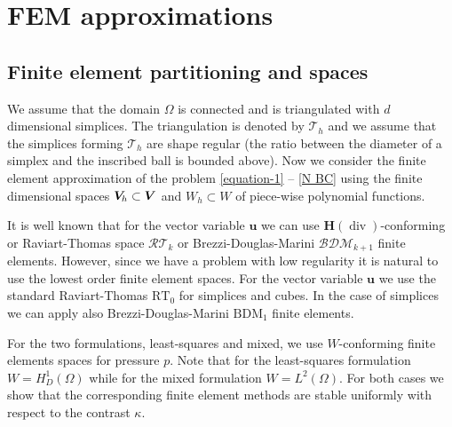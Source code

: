 \documentclass[11pt]{amsart}
\numberwithin{equation}{section}
\theoremstyle{definition}\newtheorem{example}{Example}[section]
\begin{document}
\section{FEM approximations}\label{s:FEM}

\subsection{Finite element partitioning and spaces}\label{ss:FE_spaces}
We assume that the domain $\Omega$ is connected and is triangulated
with $d$ dimensional simplices. The triangulation is denoted by
$\mathcal{T}_h$ and we assume that the simplices forming
$\mathcal{T}_h$ are shape regular (the ratio between the diameter of a
simplex and the inscribed ball is bounded above). 
Now we consider the finite element approximation of the problem
\eqref{equation-1} -- \eqref{N BC} using the finite dimensional
spaces  ${{\boldsymbol V}_{\hspace{-0.2mm}h}} \subset {{\boldsymbol V}}$ 
and $W_h \subset W$ of piece-wise polynomial functions. 

It is well known that for the vector variable ${{\mathbf u}}$ we can use ${{\boldsymbol H}}({\operatorname{div}})$-conforming 
or Raviart-Thomas space ${{\mathcal{RT}}_{{k}}}$ or Brezzi-Douglas-Marini ${{\mathcal{BDM}}_{{k+1}}}$ finite elements. 
However, since we have a problem with low regularity it is natural to use the lowest order
finite element spaces. For the vector variable ${{\mathbf u}}$ we use the standard
Raviart-Thomas 
$\text{RT}_0$ for simplices and cubes. In the case of simplices we can apply 
also Brezzi-Douglas-Marini
$\text{BDM}_1$  finite elements.

For the two formulations, least-squares and mixed, we use $W$-conforming  finite elements spaces for pressure $p$. Note that for the least-squares formulation $W=H^1_D(\Omega)$ while for the mixed formulation $W=L^2(\Omega)$.
For both cases we  show that the corresponding finite element methods are stable uniformly with 
respect to the contrast $\kappa$.
\end{document}
